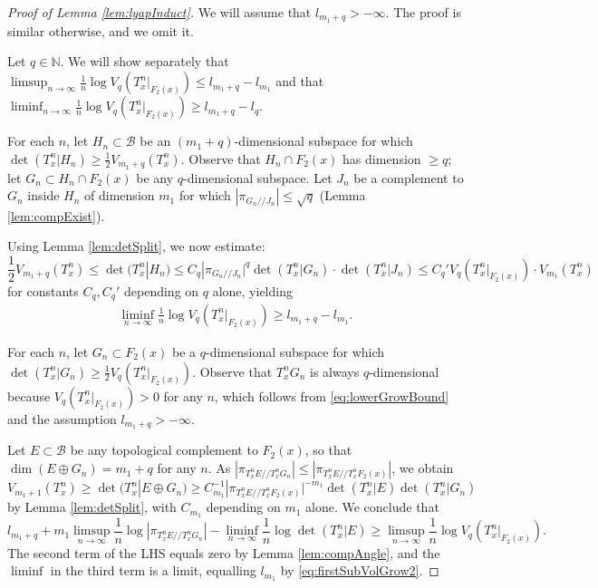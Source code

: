 \documentclass[11pt]{amsart}
\theoremstyle{theorem}
\theoremstyle{definition}
\numberwithin{equation}{section}
\newcommand{\N}{\mathbb{N}}
\newcommand{\Bc}{\mathcal{B}}
\newcommand{\ds}{/ \! /}
\begin{document}
\begin{proof}[Proof of Lemma \ref{lem:lyapInduct}]

We will assume that $l_{m_1 + q} > - \infty$. The proof is similar otherwise, and we omit it.

Let $q \in \N$. We will show separately that $\limsup_{n \to \infty} \frac{1}{n} \log V_q(T^n_x|_{F_2(x)}) \leq l_{m_1 + q} - l_{m_1}$ and that $\liminf_{n \to \infty} \frac{1}{n} \log V_q(T^n_x|_{F_2(x)}) \geq l_{m_1 + q} - l_q$.

\smallskip
{} For each $n$, let $H_n \subset \Bc$ be an $(m_1 + q)$-dimensional subspace for which $\det(T^n_x | H_n) \geq \frac{1}{2} V_{m_1 + q}(T^n_x)$. Observe that $H_n \cap F_2(x)$ has dimension $\geq q$; let $G_n \subset H_n \cap F_2(x)$ be any $q$-dimensional subspace. Let $J_n$ be a complement to $G_n$ inside $H_n$ of dimension $m_1$ for which $|\pi_{G_n \ds J_n}| \leq \sqrt{q}$ (Lemma \ref{lem:compExist}).

Using Lemma \ref{lem:detSplit}, we now estimate:
\[
\frac{1}{2} V_{m_1 + q}(T^n_x) \leq \det(T^n_x | H_n) \leq C_q |\pi_{G_n \ds J_n}|^q \det(T^n_x | G_n) \cdot \det(T^n_x | J_n) \leq C_q' V_q(T^n_x|_{F_2(x)}) \cdot V_{m_1}(T^n_x)
\]
for constants $C_q, C_q'$ depending on $q$ alone, yielding
\begin{align}\label{eq:lowerGrowBound}
\liminf_{n \to \infty} \frac{1}{n} \log V_q(T^n_x|_{F_2(x)}) \geq l_{m_1 + q} - l_{m_1}.
\end{align}

\smallskip
{}  For each $n$, let $G_n \subset F_2(x)$ be a $q$-dimensional subspace for which $\det(T^n_x | G_n) \geq \frac{1}{2} V_q(T^n_x|_{F_2(x)})$. Observe that $T^n_x G_n$ is always $q$-dimensional because $V_q(T^n_x|_{F_2(x)}) > 0$ for any $n$, which follows from \eqref{eq:lowerGrowBound} and the assumption $l_{m_1 + q} > - \infty$.

Let $E \subset \Bc$ be any topological complement to $F_2(x)$, so that $\dim(E \oplus G_n) = m_1 + q$ for any $n$. As $|\pi_{T^n_x E \ds T^n_x G_n}| \leq |\pi_{T^n_x E \ds T^n_x F_2(x)}|$, we obtain
\[
V_{m_1 + 1}(T^n_x) \geq \det(T^n_x | E \oplus G_n) \geq C_{m_1}^{-1} |\pi_{T^n_x E \ds T^n_x F_2(x)}|^{-m_1} \det(T^n_x | E) \det(T^n_x | G_n)
\]
by Lemma \ref{lem:detSplit}, with $C_{m_1}$ depending on $m_1$ alone. We conclude that
\[
l_{m_1 + q} + m_1 \limsup_{n \to \infty} \frac{1}{n} \log |\pi_{T^n_x E \ds T^n_x G_n}| - \liminf_{n \to \infty} \frac{1}{n} \log \det(T^n_x | E) \geq \limsup_{n \to \infty} \frac{1}{n} \log V_q(T^n_x|_{F_2(x)}).
\]
The second term of the LHS equals zero by Lemma \ref{lem:compAngle}, and the $\liminf$ in the third term is a limit, equalling $l_{m_1}$ by \eqref{eq:firstSubVolGrow2}.
\end{proof}
\end{document}
